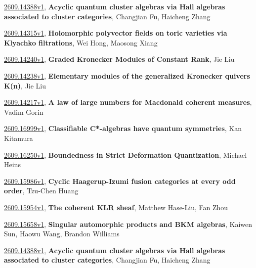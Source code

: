\documentclass[9pt, a4paper]{article}
\theoremstyle{plain}
\theoremstyle{definition}
\theoremstyle{remark}
\newcommand{\arxiv}[3]{\href{https://arxiv.org/abs/#1}{#1}, \textbf{\textcolor{arxivblue}{#2}}, #3}
\begin{document}
\arxiv{2609.14388v1}{Acyclic quantum cluster algebras via Hall algebras associated to cluster categories}{Changjian Fu, Haicheng Zhang}

\arxiv{2609.14315v1}{Holomorphic polyvector fields on toric varieties via Klyachko filtrations}{Wei Hong, Maosong Xiang}

\arxiv{2609.14240v1}{Graded Kronecker Modules of Constant Rank}{Jie Liu}

\arxiv{2609.14238v1}{Elementary modules of the generalized Kronecker quivers K(n)}{Jie Liu}

\arxiv{2609.14217v1}{A law of large numbers for Macdonald coherent measures}{Vadim Gorin}

\arxiv{2609.16999v1}{Classifiable C*-algebras have quantum symmetries}{Kan Kitamura}

\arxiv{2609.16250v1}{Boundedness in Strict Deformation Quantization}{Michael Heins}

\arxiv{2609.15986v1}{Cyclic Haagerup-Izumi fusion categories at every odd order}{Tzu-Chen Huang}

\arxiv{2609.15954v1}{The coherent KLR sheaf}{Matthew Hase-Liu, Fan Zhou}

\arxiv{2609.15658v1}{Singular automorphic products and BKM algebras}{Kaiwen Sun, Haowu Wang, Brandon Williams}

\arxiv{2609.14388v1}{Acyclic quantum cluster algebras via Hall algebras associated to cluster categories}{Changjian Fu, Haicheng Zhang}

\end{document}
